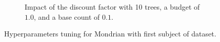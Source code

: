 \begin{figure}
\begin{subfigure}[b]{0.49\textwidth}
		 \caption{Impact of the discount factor with 10 trees, a budget of $1.0$, and a base count of $0.1$. }
		 \label{fig:mondrian-discount}
	 \end{subfigure}
		\caption{Hyperparameters tuning for Mondrian with first subject of \banosdataset dataset.}
		\label{fig:mondrian-tuning}
\end{figure}


